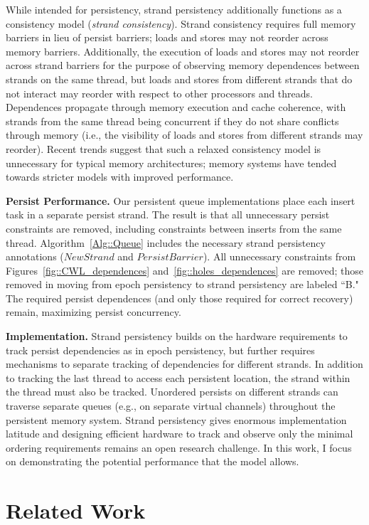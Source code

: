 While intended for persistency, strand persistency additionally functions as a consistency model (\emph{strand consistency}).
Strand consistency requires full memory barriers in lieu of persist barriers; loads and stores may not reorder across memory barriers.
Additionally, the execution of loads and stores may not reorder across strand barriers for the purpose of observing memory dependences between strands on the same thread, but loads and stores from different strands that do not interact may reorder with respect to other processors and threads.
Dependences propagate through memory execution and cache coherence, with strands from the same thread being concurrent if they do not share conflicts through memory (i.e., the visibility of loads and stores from different strands may reorder).
Recent trends suggest that such a relaxed consistency model is unnecessary for typical memory architectures; memory systems have tended towards stricter models with improved performance.

\textbf{Persist Performance.}
Our persistent queue implementations place each insert task in a separate persist strand.
The result is that all unnecessary persist constraints are removed, including constraints between inserts from the same thread.
Algorithm~\ref{Alg::Queue} includes the necessary strand persistency annotations ($NewStrand$ and $PersistBarrier$).
All unnecessary constraints from Figures~\ref{fig::CWL_dependences} and~\ref{fig::holes_dependences} are removed; those removed in moving from epoch persistency to strand persistency are labeled ``B."
The required persist dependences (and only those required for correct recovery) remain, maximizing persist concurrency.

\textbf{Implementation.}
Strand persistency builds on the hardware requirements to track persist dependencies as in epoch persistency, but further requires mechanisms to separate tracking of dependencies for different strands.
In addition to tracking the last thread to access each persistent location, the strand within the thread must also be tracked.
Unordered persists on different strands can traverse separate queues (e.g., on separate virtual channels) throughout the persistent memory system.
Strand persistency gives enormous implementation latitude and designing efficient hardware to track and observe only the minimal ordering requirements remains an open research challenge.
In this work, I focus on demonstrating the potential performance that the model allows.

\section{Related Work}
\label{sec:PersistencyModels:RelatedWork}

